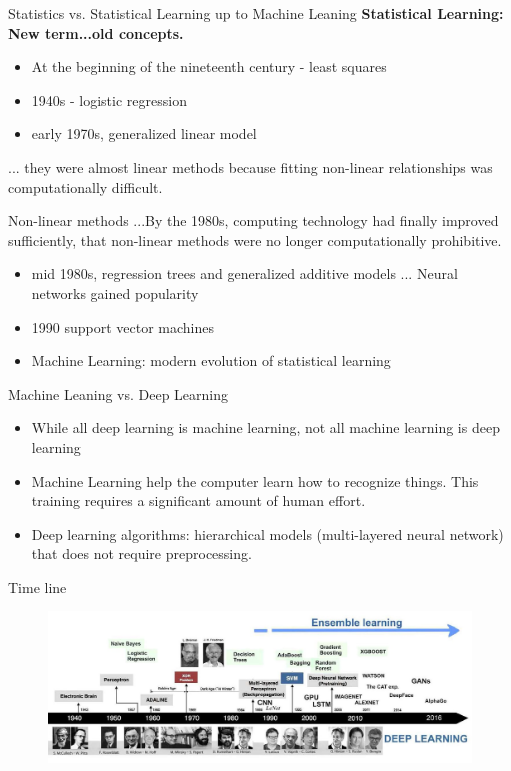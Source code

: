 \documentclass[12pt]{beamer}
\begin{document}
\begin{frame}{Statistics vs. Statistical Learning up to Machine Leaning}
	\footnotesize
	\centering
\textbf{Statistical Learning: New term...old concepts.}
	\begin{itemize}
		\item At the beginning of the nineteenth century - least squares 
		\item 1940s - logistic regression
		\item early 1970s, generalized linear model
	\end{itemize}
... they were almost linear methods because fitting non-linear relationships was computationally difficult. 

\end{frame}

\begin{frame}{Non-linear methods}
		\footnotesize
	\centering
	...By the 1980s, computing technology had finally improved sufficiently, that non-linear methods were no longer computationally prohibitive.
\begin{itemize}
	\item mid 1980s, regression trees and generalized additive models ... Neural networks gained popularity
	\item 1990 support vector machines
	\item Machine Learning: modern evolution of statistical learning
\end{itemize}
\end{frame}

\begin{frame}{Machine Leaning vs. Deep Learning}
		\small
\begin{itemize}
\item While all deep learning is machine learning, not all machine learning is deep learning
\item Machine Learning help the computer learn how to recognize things. This training requires a significant amount of human effort.
\item Deep learning algorithms: hierarchical models (multi-layered neural network) that does not require preprocessing.
\end{itemize}
\end{frame}


\begin{frame}{Time line}
\begin{figure}
	\centering
\includegraphics[width=1\linewidth]{story}		
\end{figure}
\end{frame}
\end{document}
